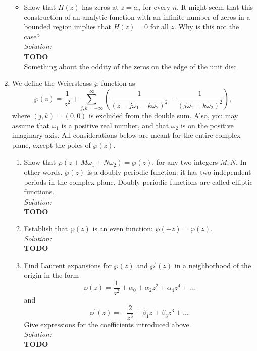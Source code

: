 \documentclass[10pt]{amsart}
\theoremstyle{nonumberplain}
\begin{document}
\begin{enumerate}[label={\bf {\arabic*}:}]
\begin{itemize}
\item Show that $H(z)$ has zeros at $z = a_n$ for every $n$.  It
  might seem that this construction of an analytic function with an
  infinite number of zeros in a bounded region implies that $H(z) =
  0$ for all $z$.  Why is this not the case? \\
\textit{Solution:} \\
\textbf{TODO} \\
Something about the oddity of the zeros on the edge of the unit disc \\
\end{itemize}
\newpage

\item We define the Weierstrass $\wp$-function as
$$
\wp(z)=\frac{1}{z^2}+\sum_{j, k=-\infty}^{\infty}\left(\frac{1}{\left(z-j \omega_1-k \omega_2\right)^2}-\frac{1}{\left(j \omega_1+k \omega_2\right)^2}\right),
$$
where $(j, k)=(0,0)$ is excluded from the double sum. Also, you may
assume that $\omega_1$ is a positive real number, and that $\omega_2$
is on the positive imaginary axis. All considerations below are meant
for the entire complex plane, except the poles of $\wp(z)$.
\begin{enumerate}
\item Show that $\wp\left(z+M \omega_1+N \omega_2\right)=\wp(z)$, for any two integers $M, N$. In other words, $\wp(z)$ is a doubly-periodic function: it has two independent periods in the complex plane. Doubly periodic functions are called elliptic functions. \\
\textit{Solution:} \\
\textbf{TODO} \\

\item Establish that $\wp(z)$ is an even function: $\wp(-z)=\wp(z)$. \\
\textit{Solution:} \\
\textbf{TODO} \\

\item Find Laurent expansions for $\wp(z)$ and $\wp^{\prime}(z)$ in a neighborhood of the origin in the form
$$ \wp(z)=\frac{1}{z^2}+\alpha_0+\alpha_2 z^2+\alpha_4 z^4+\ldots $$
and
$$ \wp^{\prime}(z)=-\frac{2}{z^3}+\beta_1 z+\beta_3 z^3+\ldots $$
Give expressions for the coefficients introduced above. \\
\textit{Solution:} \\
\textbf{TODO} \\


\end{enumerate}
\end{enumerate}
\end{document}

